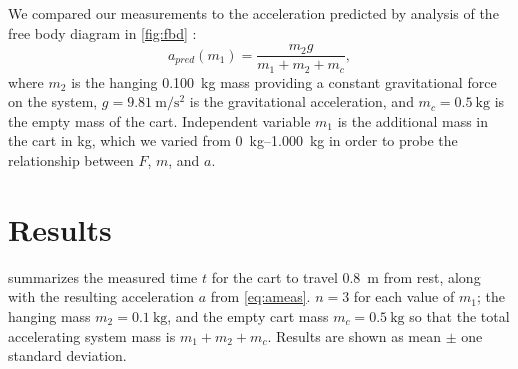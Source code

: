 ﻿\documentclass[reprint,amsmath,amssymb,aps]{revtex4-2}
\begin{document}

We compared our measurements to the acceleration predicted by analysis of the free body diagram in \cref{fig:fbd} \cite{knight2017physics}:
\begin{equation}
a_{pred}(m_1) = \dfrac{m_2 g}{m_1 + m_2 + m_c},
\label{eq:apred}
\end{equation}
where $m_2$ is the hanging \qty{0.100}{\kilo\gram} mass providing a constant gravitational force on the system, $g=\qty{9.81}{\meter\per\second\squared}$ is the gravitational acceleration, and $m_c=\qty{0.5}{\kilo\gram}$ is the empty mass of the cart. Independent variable $m_1$ is the additional mass in the cart in \unit{\kilo\gram}, which we varied from \qtyrange{0}{1.000}{\kilo\gram} in order to probe the relationship between $F$, $m$, and $a$.  






\section{Results}

 summarizes the measured time $t$ for the cart to travel \qty{0.8}{\meter} from rest, along with the resulting acceleration $a$ from \cref{eq:ameas}. $n=3$ for each value of $m_1$; the hanging mass $m_2=\qty{0.1}{\kilo\gram}$, and the empty cart mass $m_c=\qty{0.5}{\kilo\gram}$ so that the total accelerating system mass is $m_1+m_2+m_c$. Results are shown as mean $\pm$ one standard deviation. 

\end{document}
